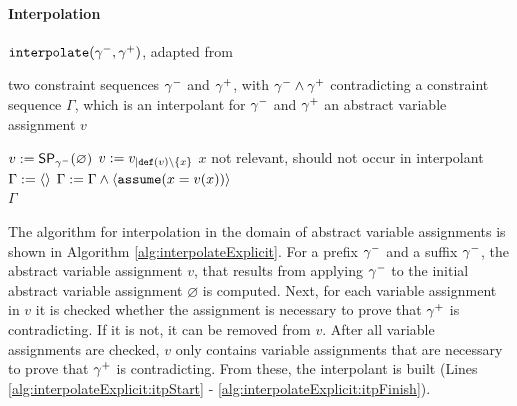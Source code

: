 \paragraph*{Interpolation}
\begin{algorithm}[t]
\caption{$\texttt{interpolate}({\gamma^{-}}, {\gamma^{+}})$, adapted from \cite{Beyer2013}}
\label{alg:interpolateExplicit}
\begin{algorithmic}[1]
\Input two constraint sequences ${\gamma^{-}}$ and ${\gamma^{+}}$, with ${\gamma^{-}} \wedge {\gamma^{+}}$ contradicting
\Output a constraint sequence $\Gamma$, which is an interpolant for ${\gamma^{-}}$ and ${\gamma^{+}}$
\Variables an abstract variable assignment $v$

\State $v := \operatorname{\operatorname{\operatorname{\mathsf{SP}}}}_{\gamma^{-}}(\varnothing)$
		\State $v := v_{|\texttt{def}(v) \setminus \{x\}}$ \Comment $x$ not relevant, should not occur in interpolant
	\EndIf
\EndFor
\State $\Gamma := \langle \rangle$
 \label{alg:interpolateExplicit:itpStart}
	\State $\Gamma := \Gamma \wedge \langle \texttt{assume}(x = v(x))\rangle$
\EndFor\\ \label{alg:interpolateExplicit:itpFinish}
\Return $\Gamma$
\end{algorithmic}
\end{algorithm}

The algorithm for interpolation in the domain of abstract variable assignments is shown in Algorithm \ref{alg:interpolateExplicit}.
For a prefix ${\gamma^{-}}$ and a suffix ${\gamma^{-}}$, the abstract variable assignment $v$, that results from applying ${\gamma^{-}}$ to the initial abstract variable assignment $\varnothing$ is computed.
Next, for each variable assignment in $v$ it is checked whether the assignment is necessary to prove that ${\gamma^{+}}$ is contradicting.
If it is not, it can be removed from $v$.
After all variable assignments are checked, $v$ only contains variable assignments that are necessary to prove that ${\gamma^{+}}$ is contradicting.
From these, the interpolant is built (Lines \ref{alg:interpolateExplicit:itpStart} - \ref{alg:interpolateExplicit:itpFinish}).

